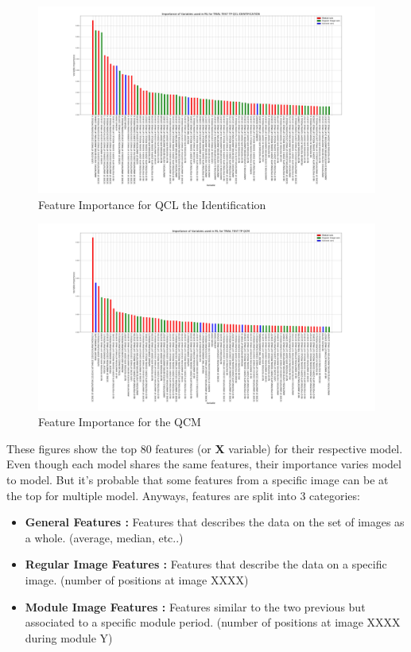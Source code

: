 \documentclass[a4paper,11pt]{report}
\numberwithin{figure}{section} %
\begin{document}
      \begin{figure}[H]
      \centering
      \includegraphics[width=.95\linewidth]{plots/var_importance_TRIAL_TEST_TP_QCL_IDENTIFICATION_2018-04-29_14_28_02.png}
      \caption{Feature Importance for QCL the Identification}
      \label{fig:var_white2}
      \end{figure}
      
      \begin{figure}[H]
      \centering
      \includegraphics[width=.95\linewidth]{plots/var_importance_TRIAL_TEST_TP_QCM_2018-04-29_14_34_16.png}
      \caption{Feature Importance for the QCM}
      \label{fig:var_white3}
      \end{figure}
    
    These figures show the top 80 features (or \textbf{X} variable) for their respective model.
    Even though each model shares the same features, their importance varies model to model.
    But it's probable that some features from a specific image can be at the top for multiple model.
    Anyways, features are split into 3 categories:
    \begin{itemize}
    \item[\textbullet] \textbf{General Features :} Features that describes the data on the set of images as a whole. (average, median, etc..)
    \item[\textbullet] \textbf{Regular Image Features :} Features that describe the data on a specific image. (number of positions at image XXXX)
    \item[\textbullet] \textbf{Module Image Features :} Features similar to the two previous but associated to a specific module period. (number of positions at image XXXX during module Y)
    \end{itemize}
    
\end{document}
